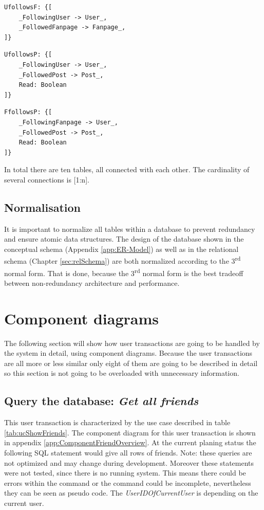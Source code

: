 \documentclass[11pt,a4paper]{report}
\begin{document}
\begin{lstlisting}[frame=single, caption=\emph{User follows fanpage}-table, keepspaces=true, breaklines=true]
UfollowsF: {[
    _FollowingUser -> User_, 
    _FollowedFanpage -> Fanpage_,
]}
\end{lstlisting}

\begin{lstlisting}[frame=single, caption=\emph{User follows post}-table, keepspaces=true, breaklines=true]
UfollowsP: {[
    _FollowingUser -> User_, 
    _FollowedPost -> Post_,
    Read: Boolean
]}
\end{lstlisting}

\begin{lstlisting}[frame=single, caption=\emph{Fanpage follows post}-table, keepspaces=true, breaklines=true]
FfollowsP: {[
    _FollowingFanpage -> User_, 
    _FollowedPost -> Post_,
    Read: Boolean
]}
\end{lstlisting}
In total there are ten tables, all connected with each other. The cardinality of several connections is [1:n].

\subsection{Normalisation}
It is important to normalize all tables within a database to prevent redundancy and ensure atomic data structures. The design of the database shown in the conceptual schema (Appendix \vref{app:ER-Model}) as well as in the relational schema (Chapter \vref{sec:relSchema}) are both normalized according to the 3\textsuperscript{rd} normal form. That is done, because the 3\textsuperscript{rd} normal form is the best tradeoff between non-redundancy architecture and performance.

\section{Component diagrams}
The following section will show how user transactions are going to be handled by the system in detail, using component diagrams. Because the user transactions are all more or less similar only eight of them are going to be described in detail so this section is not going to be overloaded with unnecessary information.

\subsection{Query the database: \emph{Get all friends}}
This user transaction is characterized by the use case described in table \vref{tab:ucShowFriends}. The component diagram for this user transaction is shown in appendix \vref{app:ComponentFriendOverview}. At the current planing status the following SQL statement would give all rows of friends. Note: these queries are not optimized and may change during development. Moreover these statements were not tested, since there is no running system. This means there could be errors within the command or the command could be incomplete, nevertheless they can be seen as pseudo code. The \emph{UserIDOfCurrentUser} is depending on the current user.
\end{document}
